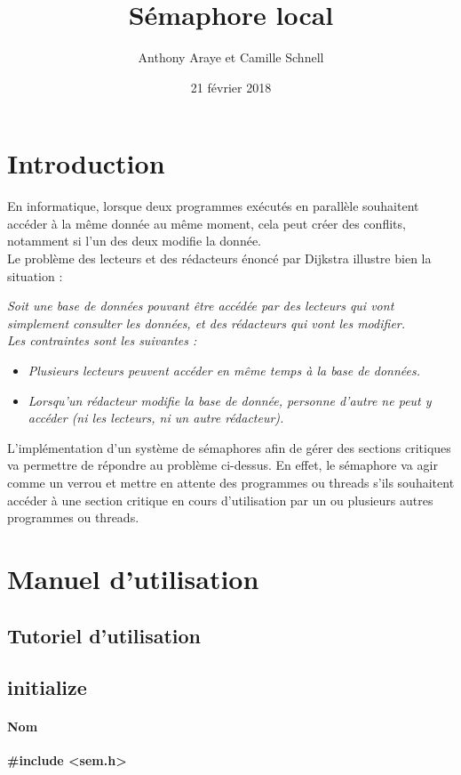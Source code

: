 \documentclass[12pt]{article}
\title{Sémaphore local}
\author{Anthony Araye et Camille Schnell}
\date{21 février 2018}
\begin{document}
\maketitle
\renewcommand{\contentsname}{Sommaire}
\tableofcontents
\newpage
\section{Introduction}
    En informatique, lorsque deux programmes exécutés en parallèle souhaitent accéder à la même donnée au même moment, cela peut créer des conflits, notamment si l'un des deux modifie la donnée. \\

    Le problème des lecteurs et des rédacteurs énoncé par Dijkstra illustre bien la situation :

    \textit{Soit une base de données pouvant être accédée par des lecteurs qui vont simplement consulter les données, et des rédacteurs qui vont les modifier. \\
    Les contraintes sont les suivantes :}
    \begin{itemize}
      \item \textit{Plusieurs lecteurs peuvent accéder en même temps à la base de données.}
      \item \textit{Lorsqu'un rédacteur modifie la base de donnée, personne d'autre ne peut y accéder (ni les lecteurs, ni un autre rédacteur).} \\
    \end{itemize}

    L'implémentation d'un système de sémaphores afin de gérer des sections critiques va permettre de répondre au problème ci-dessus. En effet, le sémaphore va agir comme un verrou et mettre en attente des programmes ou threads s'ils souhaitent accéder à une section critique en cours d'utilisation par un ou plusieurs autres programmes ou threads.


\newpage
\section{Manuel d'utilisation}
    \subsection{Tutoriel d'utilisation}
    \newpage
    \subsection{initialize}
        \paragraph{Nom\\}
        \textbf{\#include <sem.h>}
\end{document}

